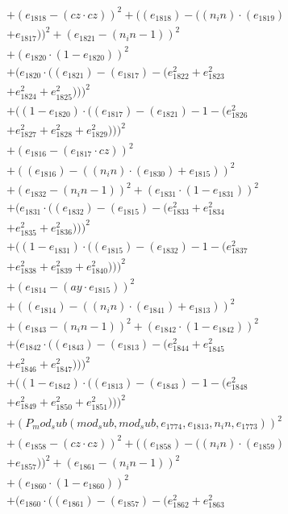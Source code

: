 \documentclass[10pt, a4paper]{article}
\begin{document}
\begin{small}
\begin{align*}
& + (e_{1818} - (cz  \cdot  cz))^{2} + ((e_{1818}) - ((n_in)  \cdot  (e_{1819}) \\
& + e_{1817}))^{2} + (e_{1821} - (n_in - 1))^{2} \\
& + (e_{1820}  \cdot  (1 - e_{1820}))^{2} \\
& + (e_{1820}  \cdot  ((e_{1821}) - (e_{1817}) - (e_{1822}^{2} + e_{1823}^{2} \\
& + e_{1824}^{2} + e_{1825}^{2})))^{2} \\
& + ((1 - e_{1820})  \cdot  ((e_{1817}) - (e_{1821}) - 1 - (e_{1826}^{2} \\
& + e_{1827}^{2} + e_{1828}^{2} + e_{1829}^{2})))^{2} \\
& + (e_{1816} - (e_{1817}  \cdot  cz))^{2} \\
& + ((e_{1816}) - ((n_in)  \cdot  (e_{1830}) + e_{1815}))^{2} \\
& + (e_{1832} - (n_in - 1))^{2} + (e_{1831}  \cdot  (1 - e_{1831}))^{2} \\
& + (e_{1831}  \cdot  ((e_{1832}) - (e_{1815}) - (e_{1833}^{2} + e_{1834}^{2} \\
& + e_{1835}^{2} + e_{1836}^{2})))^{2} \\
& + ((1 - e_{1831})  \cdot  ((e_{1815}) - (e_{1832}) - 1 - (e_{1837}^{2} \\
& + e_{1838}^{2} + e_{1839}^{2} + e_{1840}^{2})))^{2} \\
& + (e_{1814} - (ay  \cdot  e_{1815}))^{2} \\
& + ((e_{1814}) - ((n_in)  \cdot  (e_{1841}) + e_{1813}))^{2} \\
& + (e_{1843} - (n_in - 1))^{2} + (e_{1842}  \cdot  (1 - e_{1842}))^{2} \\
& + (e_{1842}  \cdot  ((e_{1843}) - (e_{1813}) - (e_{1844}^{2} + e_{1845}^{2} \\
& + e_{1846}^{2} + e_{1847}^{2})))^{2} \\
& + ((1 - e_{1842})  \cdot  ((e_{1813}) - (e_{1843}) - 1 - (e_{1848}^{2} \\
& + e_{1849}^{2} + e_{1850}^{2} + e_{1851}^{2})))^{2} \\
& + (P_mod_sub(mod_sub, mod_sub, e_{1774}, e_{1813}, n_in, e_{1773}))^{2} \\
& + (e_{1858} - (cz  \cdot  cz))^{2} + ((e_{1858}) - ((n_in)  \cdot  (e_{1859}) \\
& + e_{1857}))^{2} + (e_{1861} - (n_in - 1))^{2} \\
& + (e_{1860}  \cdot  (1 - e_{1860}))^{2} \\
& + (e_{1860}  \cdot  ((e_{1861}) - (e_{1857}) - (e_{1862}^{2} + e_{1863}^{2} \\

\end{align*}
\end{small}
\end{document}
